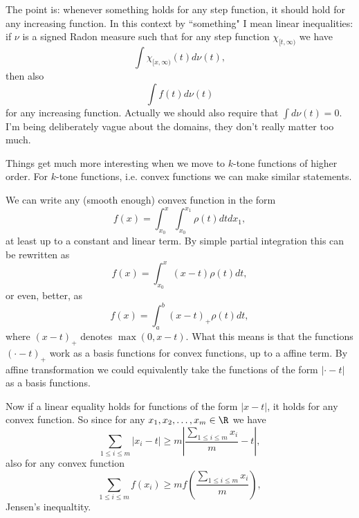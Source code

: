 The point is: whenever something holds for any step function, it should hold for any increasing function. In this context by ``something" I mean linear inequalities: if $\nu$ is a signed Radon measure such that for any step function $\chi_{[t, \infty)}$ we have
\[
	\int \chi_{[x, \infty)}(t) d \nu(t),
\]
then also
\[
	\int f(t) d \nu(t)
\]
for any increasing function. Actually we should also require that $\int d \nu(t) = 0$. I'm being deliberately vague about the domains, they don't really matter too much.

Things get much more interesting when we move to $k$-tone functions of higher order. For $k$-tone functions, i.e. convex functions we can make similar statements.

We can write any (smooth enough) convex function in the form
\[
	f(x) = \int_{x_{0}}^{x} \int_{x_{0}}^{x_{1}} \rho(t) dt dx_{1},
\]
at least up to a constant and linear term. By simple partial integration this can be rewritten as
\[
	f(x) = \int_{x_{0}}^{x} (x - t) \rho(t) d t,
\]
or even, better, as
\[
	f(x) = \int_{a}^{b} (x - t)_{+} \rho(t) dt,
\]
where $(x - t)_{+}$ denotes $\max(0, x - t)$. What this means is that the functions $(\cdot - t)_{+}$ work as a basis functions for convex functions, up to a affine term. By affine transformation we could equivalently take the functions of the form $|\cdot - t|$ as a basis functions.

Now if a linear equality holds for functions of the form $|x - t|$, it holds for any convex function. So since for any $x_{1}, x_{2}, \ldots, x_{m} \in \R$ we have
\[
	\sum_{1 \leq i \leq m} |x_{i} - t| \geq m \left|\frac{\sum_{1 \leq i \leq m} x_{i}}{m} - t\right|,
\]
also for any convex function
\[
	\sum_{1 \leq i \leq m} f(x_{i}) \geq m f\left(\frac{\sum_{1 \leq i \leq m} x_{i}}{m}\right),
\]
Jensen's inequaltity.

